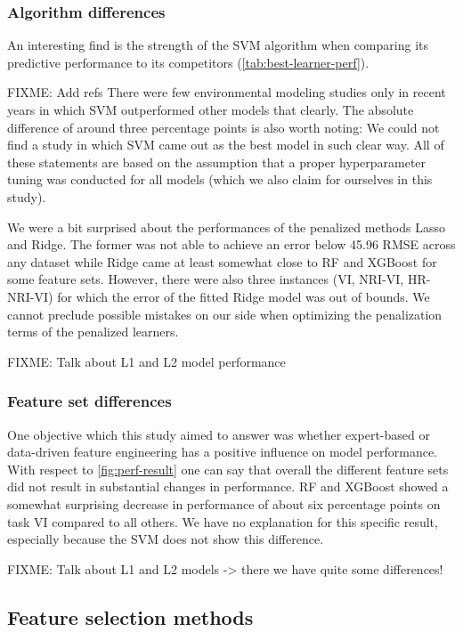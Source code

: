 \documentclass[letterpaper, peerreview]{IEEEtran}
\begin{document}
\subsubsection{Algorithm differences}
An interesting find is the strength of the SVM algorithm when comparing its predictive performance to its competitors (\autoref{tab:best-learner-perf}).

FIXME: Add refs
There were few environmental modeling studies only in recent years in which SVM outperformed other models that clearly.
The absolute difference of around three percentage points is also worth noting:
We could not find a study in which SVM came out as the best model in such clear way.
All of these statements are based on the assumption that a proper hyperparameter tuning was conducted for all models (which we also claim for ourselves in this study).

We were a bit surprised about the performances of the penalized methods Lasso and Ridge.
The former was not able to achieve an error below 45.96 RMSE across any dataset while Ridge came at least somewhat close to RF and XGBoost for some feature sets.
However, there were also three instances (VI, NRI-VI, HR-NRI-VI) for which the error of the fitted Ridge model was out of bounds.
We cannot preclude possible mistakes on our side when optimizing the penalization terms of the penalized learners.

FIXME: Talk about L1 and L2 model performance

\subsubsection{Feature set differences}
One objective which this study aimed to answer was whether expert-based or data-driven feature engineering has a positive influence on model performance.
With respect to \autoref{fig:perf-result} one can say that overall the different feature sets did not result in substantial changes in performance.
RF and XGBoost showed a somewhat surprising decrease in performance of about six percentage points on task VI compared to all others.
We have no explanation for this specific result, especially because the SVM does not show this difference.

FIXME: Talk about L1 and L2 models -> there we have quite some differences!

\subsection{Feature selection methods}
\end{document}
